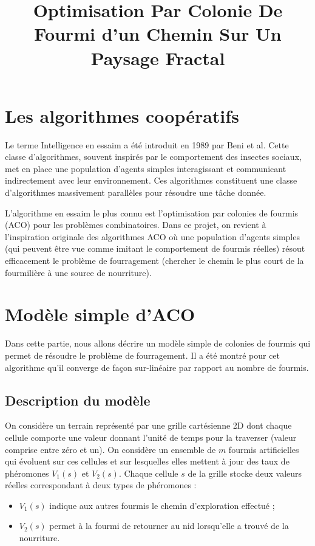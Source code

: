 \documentclass[11pt]{article}
\title{Optimisation Par Colonie De Fourmi d'un Chemin Sur Un Paysage Fractal}
\date{}
\begin{document}
\maketitle

\section{Les algorithmes coopératifs}
Le terme \og Intelligence en essaim\fg{} a été introduit en 1989 par Beni et al. Cette classe d'algorithmes, souvent inspirés par le comportement des insectes sociaux, met en place une population d'agents simples interagissant et communicant indirectement avec leur environnement. Ces algorithmes constituent une classe d'algorithmes massivement parallèles pour résoudre une tâche donnée.

L'algorithme en essaim le plus connu est l'optimisation par colonies de fourmis (ACO) pour les problèmes combinatoires. Dans ce projet, on revient à l'inspiration originale des algorithmes ACO où une population d'agents simples (qui peuvent être vue comme imitant le comportement de fourmis réelles) résout efficacement le problème de fourragement (chercher le chemin le plus court de la fourmilière à une source de nourriture).

\section{Modèle simple d'ACO}
Dans cette partie, nous allons décrire un modèle simple de colonies de fourmis qui permet de résoudre le problème de fourragement. Il a été montré pour cet algorithme qu'il converge de façon sur-linéaire par rapport au nombre de fourmis.

\subsection{Description du modèle}
On considère un terrain représenté par une grille cartésienne 2D dont chaque cellule comporte une valeur donnant l'unité de temps pour la traverser (valeur comprise entre zéro et un). On considère un ensemble de $m$ fourmis artificielles qui évoluent sur ces cellules et sur lesquelles elles mettent à jour des taux de phéromones $V_1(s)$ et $V_2(s)$. Chaque cellule $s$ de la grille stocke deux valeurs réelles correspondant à deux types de phéromones :
\begin{itemize}
  \item $V_1(s)$ indique aux autres fourmis le chemin d'exploration effectué ;
  \item $V_2(s)$ permet à la fourmi de retourner au nid lorsqu'elle a trouvé de la nourriture.
\end{itemize}
\end{document}

